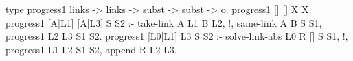 \begin{elpicode}
  type progress1 links -> links -> subst -> subst -> o.
  progress1 [] [] X X.
  progress1 [A|L1] [A|L3] S S2 :- take-link A L1 B L2, !,
    same-link A B S S1, 
    progress1 L2 L3 S1 S2.
  progress1 [L0|L1] L3 S S2 :-
    solve-link-abs L0 R [] S S1, !,
    progress1 L1 L2 S1 S2, append R L2 L3.
\end{elpicode}
